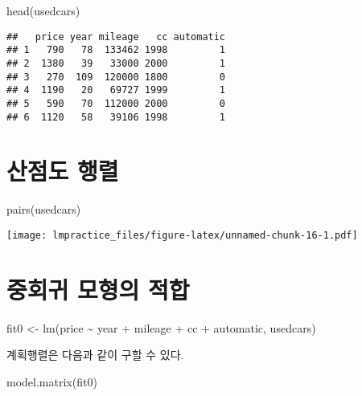 \documentclass[
]{book}
\newenvironment{Shaded}{\begin{snugshade}}{\end{snugshade}}
\newcommand{\FunctionTok}[1]{\textcolor[rgb]{0.00,0.00,0.00}{#1}}
\newcommand{\NormalTok}[1]{#1}
\newcommand{\OtherTok}[1]{\textcolor[rgb]{0.56,0.35,0.01}{#1}}
\newcommand{\SpecialCharTok}[1]{\textcolor[rgb]{0.00,0.00,0.00}{#1}}
\begin{document}
\begin{Shaded}
\begin{Highlighting}[]
\FunctionTok{head}\NormalTok{(usedcars)}
\end{Highlighting}
\end{Shaded}

\begin{verbatim}
##   price year mileage   cc automatic
## 1   790   78  133462 1998         1
## 2  1380   39   33000 2000         1
## 3   270  109  120000 1800         0
## 4  1190   20   69727 1999         1
## 5   590   70  112000 2000         0
## 6  1120   58   39106 1998         1
\end{verbatim}

\hypertarget{uxc0b0uxc810uxb3c4-uxd589uxb82c}{%
\section{산점도 행렬}\label{uxc0b0uxc810uxb3c4-uxd589uxb82c}}

\begin{Shaded}
\begin{Highlighting}[]
\FunctionTok{pairs}\NormalTok{(usedcars)}
\end{Highlighting}
\end{Shaded}

\texttt{[image: lmpractice\_files/figure-latex/unnamed-chunk-16-1.pdf]}

\hypertarget{uxc911uxd68cuxadc0-uxbaa8uxd615uxc758-uxc801uxd569}{%
\section{중회귀 모형의 적합}\label{uxc911uxd68cuxadc0-uxbaa8uxd615uxc758-uxc801uxd569}}

\begin{Shaded}
\begin{Highlighting}[]
\NormalTok{fit0 }\OtherTok{\textless{}{-}} \FunctionTok{lm}\NormalTok{(price }\SpecialCharTok{\textasciitilde{}}\NormalTok{ year }\SpecialCharTok{+}\NormalTok{ mileage }\SpecialCharTok{+}\NormalTok{ cc }\SpecialCharTok{+}\NormalTok{ automatic, usedcars)}
\end{Highlighting}
\end{Shaded}

계획행렬은 다음과 같이 구할 수 있다.

\begin{Shaded}
\begin{Highlighting}[]
\FunctionTok{model.matrix}\NormalTok{(fit0)}
\end{Highlighting}
\end{Shaded}
\end{document}
